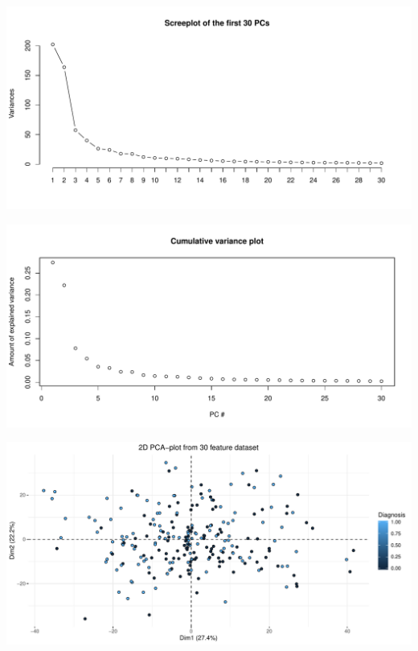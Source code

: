 \documentclass[]{article}
\begin{document}
\begin{center}\includegraphics[width=1\linewidth]{Project2_as81_files/figure-latex/unnamed-chunk-17-1} \end{center}

\begin{center}\includegraphics[width=1\linewidth]{Project2_as81_files/figure-latex/unnamed-chunk-18-1} \end{center}

\begin{center}\includegraphics[width=1\linewidth]{Project2_as81_files/figure-latex/unnamed-chunk-19-1} \end{center}
\end{document}
